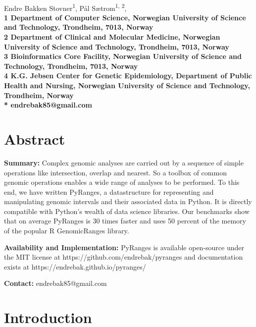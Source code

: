 \documentclass[10pt,letterpaper]{article}
\begin{document}
\vspace*{0.35in}

\begin{flushleft}
{\Large
  \textbf{}
}
\newline
\\
Endre Bakken Stovner\textsuperscript{1},
Pål Sætrom\textsuperscript{1, 2},
\\
\bf{1} Department of
  Computer Science, Norwegian University
  of Science and Technology, Trondheim, 7013, Norway
\\
\bf{2} Department of Clinical and Molecular Medicine, Norwegian
  University of Science and Technology, Trondheim, 7013, Norway
\\
\bf{3} Bioinformatics Core Facility, Norwegian University of Science and
Technology, Trondheim, 7013, Norway
\\
\bf{4} K.G. Jebsen Center for Genetic Epidemiology, Department of Public Health
and Nursing, Norwegian University of Science and Technology, Trondheim, Norway
\\
\bigskip
* endrebak85@gmail.com

\end{flushleft}

\section*{Abstract}

\textbf{Summary:} Complex genomic analyses are carried out by a sequence of
simple operations like intersection, overlap and nearest. So a toolbox of common
genomic operations enables a wide range of analyses to be performed. To this
end, we have written PyRanges, a datastructure for representing and manipulating
genomic intervals and their associated data in Python. It is directly compatible
with Python's wealth of data science libraries. Our benchmarks show that on
average PyRanges is 30 times faster and uses 50 percent of the memory of the
popular R GenomicRanges library.

\textbf{Availability and Implementation:} PyRanges is available open-source under
the MIT license at https://github.com/endrebak/pyranges and documentation exists
at https://endrebak.github.io/pyranges/

\textbf{Contact:} endrebak85@gmail.com

\section*{Introduction}
\end{document}
